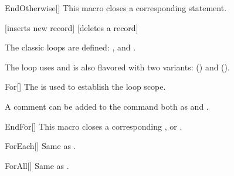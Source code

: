 \documentclass[a4paper, 11pt]{article}
\begin{document}
\begin{macro}{EndOtherwise}[]
    This macro closes a corresponding  statement.

    \StatementOptions
\end{macro}

\begin{tcblisting}{}
    \begin{algorithmic}
            [inserts new record]
            \EndCase
            [deletes a record]
            \EndCase
            \Otherwise
            \EndOtherwise
        \EndSwitch
    \end{algorithmic}
\end{tcblisting}

The classic loops are defined: ,  and .

The  loop uses  and is also flavored with two variants:  () and  ().

\begin{macro}{For}[]
    The  is used to establish the loop scope.

    A comment can be added to the command both as  and .

    \BlockOptions
\end{macro}

\begin{macro}{EndFor}[]
    This macro closes a corresponding ,  or .

    \StatementOptions
\end{macro}

\begin{macro}{ForEach}[]
    Same as .
\end{macro}

\begin{macro}{ForAll}[]
    Same as .
\end{macro}
\end{document}
